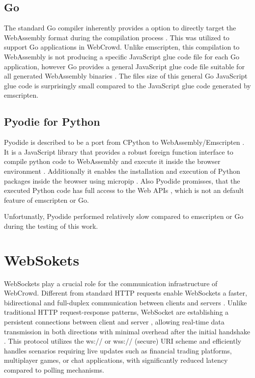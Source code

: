 \subsection{Go}
\label{subsec:methodology:wasm:go}
The standard Go compiler inherently provides a option to directly target the WebAssembly format during the compilation process \cite{methodology:go}. This was utilized to support Go applications in WebCrowd. Unlike emscripten, this compilation to WebAssembly is not producing a specific JavaScript glue code file for each Go application, however Go provides a general JavaScript glue code file suitable for all generated WebAssembly binaries \cite{methodology:go}. The files size of this general Go JavaScript glue code is surprisingly small compared to the JavaScript glue code generated by emscripten.

\subsection{Pyodie for Python}
\label{subsec:methodology:wasm:python}
Pyodide is described to be a port from CPython to WebAssembly/Emscripten \cite{methodology:pyodie}. It is a JavaScript library that provides a robust foreign function interface to compile python code to WebAssembly and execute it inside the browser environment \cite{methodology:pyodie}. Additionally it enables the installation and execution of Python packages inside the browser using micropip \cite{methodology:pyodie}. Also Pyodide promisses, that the executed Python code has full access to the Web \ac{API}s \cite{methodology:pyodie}, which is not an default feature of emscripten or Go.

Unfortunatly, Pyodide performed relatively slow compared to emscripten or Go during the testing of this work.

\section{WebSokets}
\label{sec:methodology:websokets}
WebSockets play a crucial role for the communication infrastructure of WebCrowd. Different from standard \ac{HTTP} requests enable WebSockets a faster, bidirectional and full-duplex communication between clients and servers \cite{methodology:websockets1, methodology:websockets3, methodology:websockets2}. Unlike traditional \ac{HTTP} request-response patterns, WebSocket are establishing a persistent connections between client and server \cite{methodology:websockets3}, allowing real-time data transmission in both directions with minimal overhead after the initial handshake \cite{methodology:websockets3}. This protocol utilizes the ws:// or wss:// (secure) URI scheme and efficiently handles scenarios requiring live updates such as financial trading platforms, multiplayer games, or chat applications, with significantly reduced latency compared to polling mechanisms.

